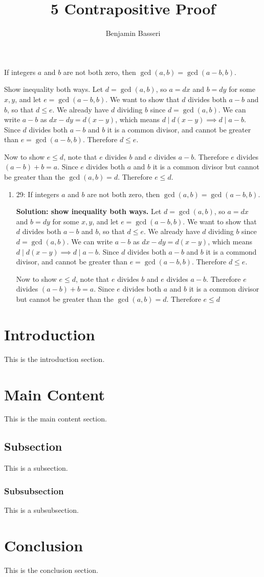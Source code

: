 \documentclass{article}
\title{5 Contrapositive Proof}
\author{Benjamin Basseri}
\date{}
\begin{document}
\maketitle

\begin{problem}
If integers $a$ and $b$ are not both zero, then $\gcd(a,b)=\gcd(a-b,b)$.
\end{problem}

\begin{solution}

  Show inequality both ways. Let $d = \gcd(a, b)$, so $a = dx$ and $b = dy$ for some $x, y$, and let $e = \gcd(a - b, b)$. We want to show that $d$ divides both $a - b$ and $b$, so that $d \leq e$. We already have $d$ dividing $b$ since $d = \gcd(a, b)$. We can write $a - b$ as $dx - dy = d(x-y)$, which means $d\mid d(x-y) \implies d\mid a-b$. Since $d$ divides both $a-b$ and $b$ it is a common divisor, and cannot be greater than $e = \gcd(a-b, b)$. Therefore $d \leq e$.

  Now to show $e \leq d$, note that $e$ divides $b$ and $e$ divides $a - b$. Therefore $e$ divides $(a - b) + b = a$. Since $e$ divides both $a$ and $b$ it is a common divisor but cannot be greater than the $\gcd(a, b) = d$. Therefore $e \leq d$.
\end{solution}

\begin{enumerate}
  \item 29: If integers $a$ and $b$ are not both zero, then $\gcd(a,b)=\gcd(a-b,b)$.

        \textbf{Solution: show inequality both ways.} Let $d = \gcd(a, b)$, so $a = dx$ and $b = dy$ for some $x, y$, and let $e = \gcd(a - b, b)$. We want to show that $d$ divides both $a - b$ and $b$, so that $d \leq e$. We already have $d$ dividing $b$ since $d = \gcd(a, b)$. We can write $a - b$ as $dx - dy = d(x-y)$, which means $d\mid d(x-y) \implies d\mid a-b$. Since $d$ divides both $a-b$ and $b$ it is a commond divisor, and cannot be greater than $e = \gcd(a-b, b)$. Therefore $d \leq e$.

        Now to show $e \leq d$, note that $e$ divides $b$ and $e$ divides $a - b$. Therefore $e$ divides $(a - b) + b = a$. Since $e$ divides both $a$ and $b$ it is a common divisor but cannot be greater than the $\gcd(a, b) = d$. Therefore $e \leq d$
\end{enumerate}
\section{Introduction}
This is the introduction section.

\section{Main Content}
This is the main content section.

\subsection{Subsection}
This is a subsection.

\subsubsection{Subsubsection}
This is a subsubsection.

\section{Conclusion}
This is the conclusion section.
\end{document}
